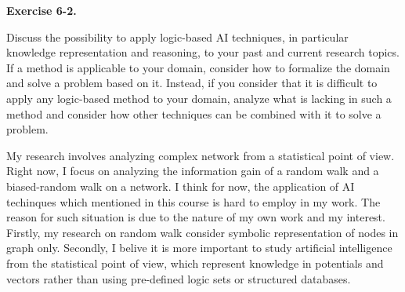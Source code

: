 \documentclass[12pt,twoside]{article}
\begin{document}
\begin{exercises}
\textbf{Exercise 6-2.}

Discuss the possibility to apply logic-based AI techniques, in particular knowledge representation and reasoning, to your past and current research topics. If a method is applicable to your domain, consider how to formalize the domain and solve a problem based on it. Instead, if you consider that it is difficult to apply any logic-based method to your domain, analyze what is lacking in such a method and consider how other techniques can be combined with it to solve a problem.

\ifsolution \solution{}

My research involves analyzing complex network from a statistical point of view. Right now, I focus on analyzing the information gain of a random walk and a biased-random walk on a network. I think for now, the application of AI techinques which mentioned in this course is hard to employ in my work. The reason for such situation is due to the nature of my own work and my interest. Firstly, my research on random walk consider symbolic representation of nodes in graph only. Secondly, I belive it is more important to study artificial intelligence from the statistical point of view, which represent knowledge in potentials and vectors rather than using pre-defined logic sets or structured databases.

\fi

\end{exercises}
\end{document}
